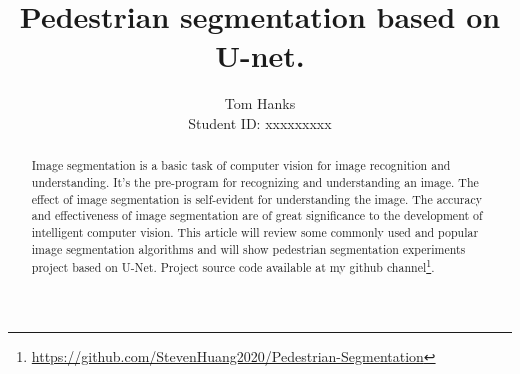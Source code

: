 \documentclass[10pt, a4paper]{article}
\title{Pedestrian segmentation based on U-net.}
\date{}
\author{Tom Hanks \\ Student ID: xxxxxxxxx}
\begin{document}
	\maketitle
 	
	\begin{multicols}{2}
	\begin{abstract} \justify %
Image segmentation is a basic task of computer vision for image recognition and understanding. It’s the pre-program for recognizing and understanding an image. The effect of image segmentation is self-evident for understanding the image. The accuracy and effectiveness of image segmentation are of great significance to the development of intelligent computer vision. This article will review some commonly used and popular image segmentation algorithms and will show pedestrian segmentation experiments project based on U-Net. Project source code available at my github channel\footnote{\label{}\url{https://github.com/StevenHuang2020/Pedestrian-Segmentation}}.
	\end{abstract}

	\setlength{\lineskip}{3em}     %
	\setlength{\parskip}{0.5em}     %


\end{multicols}
\end{document}
